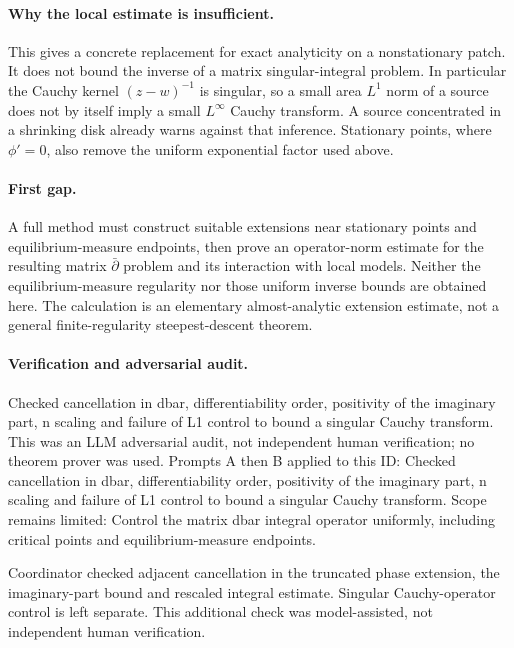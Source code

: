 \documentclass[11pt]{article}
\begin{document}
\paragraph{Why the local estimate is insufficient.}This gives a concrete replacement for exact analyticity on a nonstationary patch. It does not bound the inverse of a matrix singular-integral problem. In particular the Cauchy kernel \((z-w)^{-1}\) is singular, so a small area \(L^1\) norm of a source does not by itself imply a small \(L^\infty\) Cauchy transform. A source concentrated in a shrinking disk already warns against that inference. Stationary points, where \(\phi'=0\), also remove the uniform exponential factor used above.
\paragraph{First gap.}A full method must construct suitable extensions near stationary points and equilibrium-measure endpoints, then prove an operator-norm estimate for the resulting matrix \(\bar\partial\) problem and its interaction with local models. Neither the equilibrium-measure regularity nor those uniform inverse bounds are obtained here. The calculation is an elementary almost-analytic extension estimate, not a general finite-regularity steepest-descent theorem.

\paragraph{Verification and adversarial audit.}
Checked cancellation in dbar, differentiability order, positivity of the imaginary part, n scaling and failure of L1 control to bound a singular Cauchy transform. This was an LLM adversarial audit, not independent human verification; no theorem prover was used. Prompts A then B applied to this ID: Checked cancellation in dbar, differentiability order, positivity of the imaginary part, n scaling and failure of L1 control to bound a singular Cauchy transform. Scope remains limited: Control the matrix dbar integral operator uniformly, including critical points and equilibrium-measure endpoints.

Coordinator checked adjacent cancellation in the truncated phase extension, the imaginary-part bound and rescaled integral estimate. Singular Cauchy-operator control is left separate. This additional check was model-assisted, not independent human verification.
\end{document}
